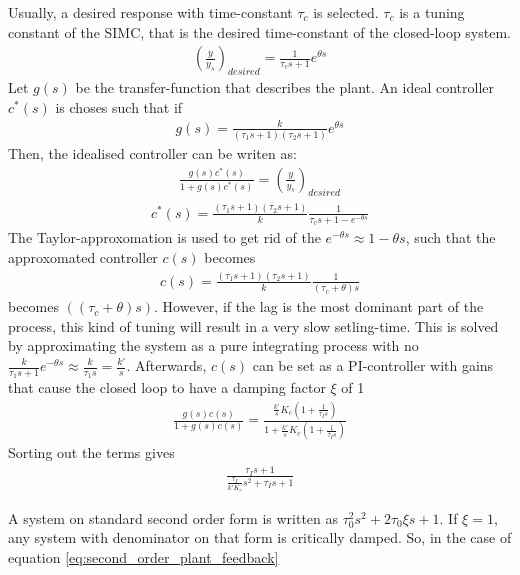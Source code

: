 \noindent
Usually, a desired response with time-constant $\tau_c$ is selected. $\tau_c$ is a tuning constant of the SIMC, that is the desired time-constant of the closed-loop system. 
\begin{align}
    \left(\frac{y}{y_{s}}\right)_{desired} = \frac{1}{\tau_c s +1} e^{\theta s}
\end{align}
 Let $g(s)$ be the transfer-function that describes the plant. An ideal controller $c^*(s)$ is choses such that if 
 \begin{align}
     g(s) = \frac{k}{\left( \tau_1 s+1 \right) \left( \tau_2 s +1 \right)} e^{\theta s}
 \end{align}
Then, the idealised controller can be writen as:
 \begin{align}
    \frac{g(s) c^*(s)}{1 + g(s) c^*(s)} = \left(\frac{y}{y_{s}}\right)_{desired}
 \end{align}
\begin{align}
    c^*(s) = \frac{\left( \tau_1 s +1 \right)\left( \tau_2 s +1 \right)}{k} \frac{1}{\tau_c s+1 - e^{- \theta s}}
\end{align}
The Taylor-approxomation is used to get rid of the $e^{-\theta s} \approx 1 - \theta s$, such that the approxomated controller $c(s)$ becomes
\begin{align}
    \label{eq:delay_controller}
    c(s) = \frac{\left( \tau_1 s +1 \right)\left( \tau_2 s +1 \right)}{k} \frac{1}{\left( \tau_c + \theta \right)s}
\end{align}
becomes $ \left(\left( \tau_c + \theta \right)s\right)$. However, if the lag is the most dominant part of the process, this kind of tuning will result in a very slow setling-time.  This is solved by approximating the system as a pure integrating process with no $ \frac{k}{\tau_1 s +1 } e^{- \theta s} \approx \frac{k}{\tau_1 s} = \frac{k'}{s}$. Afterwards, $c(s)$ can be set as a PI-controller with gains that cause the closed loop to have a damping factor $\xi$ of 1
\begin{align}
    \label{eq:second_order_plant_feedback}
    \frac{g(s)c(s)}{1 + g(s)c(s)} = \frac{ \frac{k'}{s} K_c \left(1+ \frac{1}{\tau_I s}\right)}{1 + \frac{k'}{s} K_c \left(1+ \frac{1}{\tau_I s}\right)}
\end{align}
Sorting out the terms gives 
\begin{align}
    \frac{\tau_I s + 1}{\frac{\tau_I }{k' K_c}s^2 + \tau_I s + 1}
\end{align}

\noindent
A system on standard second order form is written as $\tau_0^2 s^2 + 2\tau_0 \xi s +1$. If $\xi =1$, any system with denominator on that form is critically damped. So, in the case of equation \ref{eq:second_order_plant_feedback}

